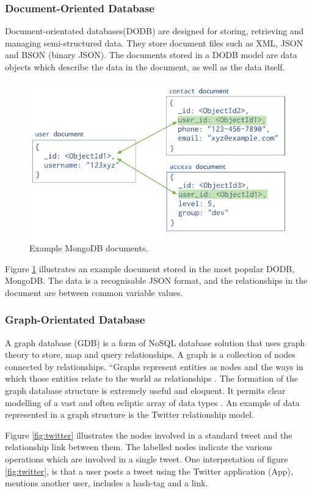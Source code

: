 \subsubsection{Document-Oriented Database}
Document-orientated databases(DODB) are designed for storing, retrieving and managing semi-structured data. They store document files such as XML, JSON and BSON (binary JSON). The documents stored in a DODB model are data objects which describe the data in the document, as well as the data itself. \begin{figure}[H]\begin{center}\includegraphics[width=0.75\linewidth]{images/mongodbmodel}\caption{Example MongoDB documents.}\label{fig:mongo}\end{center}\end{figure} Figure \ref{fig:mongo} illustrates an example document stored in the most popular DODB, MongoDB. The data is a recognisable JSON format, and the relationships in the document are between common variable values.

\subsubsection{Graph-Orientated Database}
A graph database (GDB) is a form of NoSQL database solution that uses graph theory to store, map and query relationships. A graph is a collection of nodes connected by relationships. ``Graphs represent entities as nodes and the ways in which those entities relate to the world as relationships \cite{gd}. The formation of the graph database structure is extremely useful and eloquent. It permits clear modelling of a vast and often ecliptic array of data types \cite{gd}. An example of data represented in a graph structure is the Twitter relationship model. 

Figure \ref{fig:twitter} illustrates the nodes involved in a standard tweet and the relationship link between them. The labelled nodes indicate the various operations which are involved in a single tweet. One interpretation of figure \ref{fig:twitter}, is that a user posts a tweet using the Twitter application (App), mentions another user, includes a hash-tag and a link.

